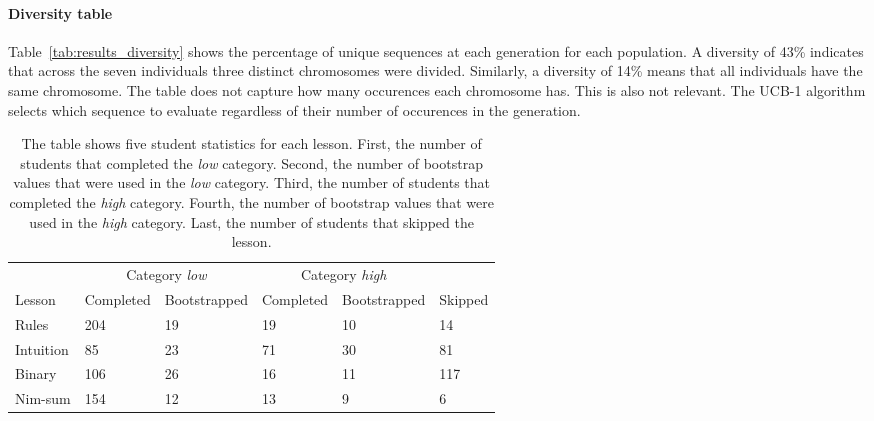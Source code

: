 \paragraph{Diversity table}
Table~\ref{tab:results_diversity} shows the percentage of unique sequences at
each generation for each population. A diversity of 43\% indicates that across
the seven individuals three distinct chromosomes were divided. Similarly, a
diversity of 14\% means that all individuals have the same chromosome. The
table does not capture how many occurences each chromosome has. This is also
not relevant. The UCB-1 algorithm selects which sequence to evaluate regardless
of their number of occurences in the generation.
\begin{table}
	\centering
	\caption[Student statistics of each lesson]{The table shows five student statistics for each lesson.
	First, the number of students that completed the \emph{low} category.
	Second, the number of bootstrap values that were used in the
	\emph{low} category. Third, the number of students that completed the
	\emph{high} category. Fourth, the number of bootstrap values that were used in
	the \emph{high} category. Last, the number of students that skipped the
	lesson.}
	\label{tab:exp_stats_students}
	\begin{tabular}{l|lllll}\hline
		\multicolumn{1}{l}{}& \multicolumn{2}{c}{Category \emph{low}} & \multicolumn{2}{c}{Category
			\emph{high}} & \\
		\multicolumn{1}{l}{Lesson} & Completed & Bootstrapped & Completed & Bootstrapped & Skipped\\
		\hline
		Rules & 204 & 19 & 19 & 10 & 14 \\
		Intuition & 85 &  23 & 71 & 30 & 81 \\
		Binary & 106 & 26 & 16 & 11 & 117 \\
		Nim-sum & 154 & 12 & 13 & 9 & 6 \\
	\end{tabular}
\end{table}

